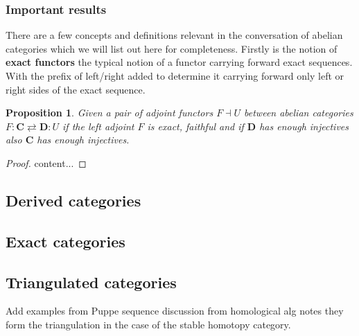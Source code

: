 \documentclass[12pt]{article}
\numberwithin{equation}{section}
\newtheorem{proposition}{Proposition}[section]
\begin{document}
\begin{appendices}
	\subsubsection{Important results}
	There are a few concepts and definitions relevant in the conversation of abelian categories which we will list out here for completeness. Firstly is the notion of \textbf{exact functors} the typical notion of a functor carrying forward exact sequences. With the prefix of left/right added to determine it carrying forward only left or right sides of the exact sequence.
	
	
	\begin{proposition}\label{adjointinjective}
		Given a pair of adjoint functors $F \dashv U$ between abelian categories $F:\mathbf{C} \rightleftarrows \mathbf{D}:U$ if the left adjoint $F$ is exact, faithful and if $ \mathbf{D}$ has enough injectives also $\mathbf{C}$ has enough injectives.
	\end{proposition}
	\begin{proof}
		content...
	\end{proof}
	\subsection{Derived categories}
	\subsection{Exact categories}
	\subsection{Triangulated categories}
	Add examples from Puppe sequence discussion from homological alg notes they form the triangulation in the case of the stable homotopy category.
	\end{appendices}
	
	
	\appendix
	
	
	
	
	
	
\end{document}
